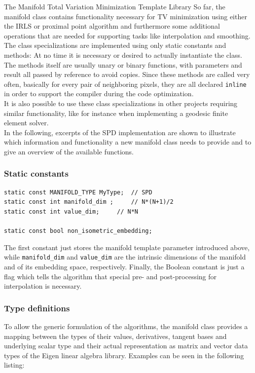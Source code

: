\begin{chapter}{The Manifold Total Variation Minimization Template Library}
So far, the manifold class contains functionality necessary for TV minimization using either the IRLS or proximal point algorithm and furthermore some additional operations
that are needed for supporting tasks like interpolation and smoothing. The class specializations are implemented using only static constants and methods: At no time it is necessary or 
desired to actually instantiate the class. The methods itself are usually unary or binary functions, with parameters and result all passed by reference to avoid copies.
Since these methods are called very often, basically for every pair of neighboring pixels, they are all declared \texttt{inline} in order to support the compiler during 
the code optimization.\\

It is also possible to use these class specializations in other projects requiring similar functionality, like 
for instance when implementing a geodesic finite element solver.\\

In the following, excerpts of the SPD implementation are shown to illustrate which information and functionality a new manifold class needs to provide and to give an overview
of the available functions.

\subsubsection{Static constants} %
\label{ssub:Static constants}
\cppinline
\begin{lstlisting}
static const MANIFOLD_TYPE MyType;	// SPD
static const int manifold_dim ;		// N*(N+1)/2
static const int value_dim;		// N*N

static const bool non_isometric_embedding;
\end{lstlisting}
The first constant just stores the manifold template parameter introduced above, while \texttt{manifold\_dim} and \texttt{value\_dim} are the intrinsic dimensions of the manifold
and of its embedding space, respectively. Finally, the Boolean constant is just a flag which tells the algorithm that special pre- and post-processing for interpolation is necessary.\\

\subsubsection{Type definitions} %
\label{ssub:Type definitions}
To allow the generic formulation of the algorithms, the manifold class provides a mapping between the types of their values, derivatives, tangent bases and underlying scalar type and their 
actual representation as matrix and vector data types of the Eigen linear algebra library. Examples can be seen in the following listing:


\end{chapter}
